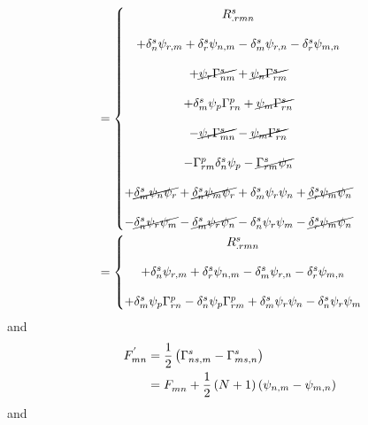 \begin{align}
&=\left\{\begin{matrix}
R^{s}_{.rmn}\\\\
+\delta^s_n\psi_{r,m} +\delta^s_r\psi_{n,m}-\delta^s_m\psi_{r,n} -\delta^s_r\psi_{m,n}\\\\
+\cancel{\psi_r\Gamma^{s}_{nm}} +\cancel{\psi_n \Gamma^{s}_{rm}}\\\\
+\delta^s_m\psi_p\Gamma^{p}_{rn} +\cancel{\psi_m\Gamma^{s}_{rn}}\\\\
-\cancel{\psi_r\Gamma^{s}_{mn}} -\cancel{\psi_m\Gamma^{s}_{rn}}\\\\
-\Gamma^{p}_{rm}\delta^s_n\psi_p -\cancel{\Gamma^{s}_{rm}\psi_n}\\\\
+\cancel{\delta^s_m\psi_n\psi_r} +\cancel{\delta^s_n\psi_m\psi_r }+\delta^s_m\psi_r\psi_n  +\cancel{\delta^s_r\psi_m\psi_n} \\\\
-\cancel{\delta^s_n\psi_r \psi_m }-\cancel{\delta^s_m\psi_r \psi_n}-\delta^s_n\psi_r\psi_m -\cancel{\delta^s_r\psi_m\psi_n}\\
\end{matrix}\right.\\
&=\left\{\begin{matrix}
R^{s}_{.rmn}\\\\
+\delta^s_n\psi_{r,m} +\delta^s_r\psi_{n,m}-\delta^s_m\psi_{r,n} -\delta^s_r\psi_{m,n}\\\\
+\delta^s_m\psi_p\Gamma^{p}_{rn} 
-\delta^s_n\psi_p \Gamma^{p}_{rm}
+\delta^s_m\psi_r\psi_n  -\delta^s_n\psi_r\psi_m 
\end{matrix}\right.
\end{align}
and
\begin{align}
F^{'}_{mn} &= \frac{1}{2}\left(\Gamma^{s}_{ns,m} - \Gamma^{s}_{ms,n}\right)\\
&=F^{}_{mn} + \frac{1}{2}\left(N+1\right)\left(\psi_{n,m} -\psi_{m,n}\right)
\end{align}
and

